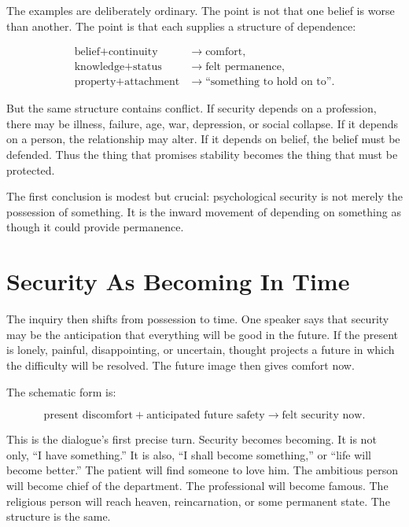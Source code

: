 The examples are deliberately ordinary. The point is not that one belief is worse than another. The point is that each supplies a structure of dependence:

\begin{align}
\text{belief} + \text{continuity} &\longrightarrow \text{comfort}, \\
\text{knowledge} + \text{status} &\longrightarrow \text{felt permanence}, \\
\text{property} + \text{attachment} &\longrightarrow \text{``something to hold on to''}.
\end{align}

But the same structure contains conflict. If security depends on a profession, there may be illness, failure, age, war, depression, or social collapse. If it depends on a person, the relationship may alter. If it depends on belief, the belief must be defended. Thus the thing that promises stability becomes the thing that must be protected.

The first conclusion is modest but crucial: psychological security is not merely the possession of something. It is the inward movement of depending on something as though it could provide permanence.

\section{Security As Becoming In Time}

The inquiry then shifts from possession to time. One speaker says that security may be the anticipation that everything will be good in the future. If the present is lonely, painful, disappointing, or uncertain, thought projects a future in which the difficulty will be resolved. The future image then gives comfort now.

The schematic form is:

\begin{equation}
\text{present discomfort}
+
\text{anticipated future safety}
\longrightarrow
\text{felt security now}.
\end{equation}

This is the dialogue's first precise turn. Security becomes becoming. It is not only, ``I have something.'' It is also, ``I shall become something,'' or ``life will become better.'' The patient will find someone to love him. The ambitious person will become chief of the department. The professional will become famous. The religious person will reach heaven, reincarnation, or some permanent state. The structure is the same.

